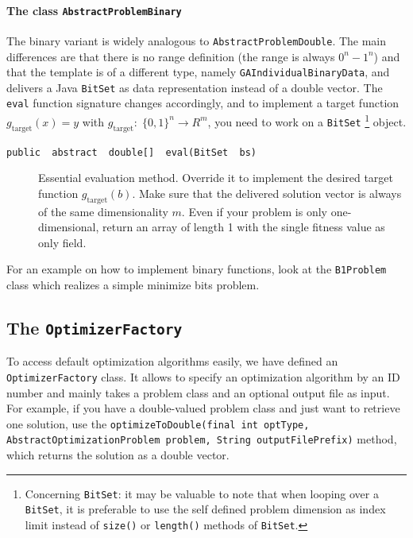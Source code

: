 \paragraph*{The class \texttt{AbstractProblemBinary}}

The binary variant is widely analogous to \texttt{AbstractProblemDouble}.
The main differences are that there is no range definition (the range
is always $0^{n}-1^{n}$) and that the template is of a different
type, namely \texttt{GAIndividualBinaryData}, and delivers a Java
\texttt{BitSet} as data representation instead of a double vector.
The \texttt{eval} function signature changes accordingly, and to implement
a target function $g_{\mathrm{target}}(x)=y$ with $g_{\mathrm{target}}:\;\{0,1\}^{n}\rightarrow R^{m}$,
you need to work on a \texttt{BitSet}%
\footnote{Concerning \texttt{BitSet}: it may be valuable to note that when looping
over a \texttt{BitSet}, it is preferable to use the self defined problem
dimension as index limit instead of \texttt{size()} or \texttt{length()}
methods of \texttt{BitSet}.%
} object.
\begin{description}
\item [{\texttt{public ~abstract ~double{[}{]} ~eval(BitSet ~bs)}}] Essential
evaluation method. Override it to implement the desired target function
$g_{\mathrm{target}}(b)$. Make sure that the delivered solution vector
is always of the same dimensionality $m$. Even if your problem is
only one-dimensional, return an array of length 1 with the single
fitness value as only field.
\end{description}
For an example on how to implement binary functions, look at the \texttt{B1Problem}
class which realizes a simple minimize bits problem.


\subsection{The \texttt{OptimizerFactory}\label{sub:The-OptimizerFactory}}

To access default optimization algorithms easily, we have defined
an \texttt{OptimizerFactory} class. It allows to specify an optimization
algorithm by an ID number and mainly takes a problem class and an
optional output file as input. For example, if you have a double-valued
problem class and just want to retrieve one solution, use the \texttt{optimizeToDouble(final
int optType, AbstractOptimizationProblem problem, String outputFilePrefix)}
method, which returns the solution as a double vector. 

